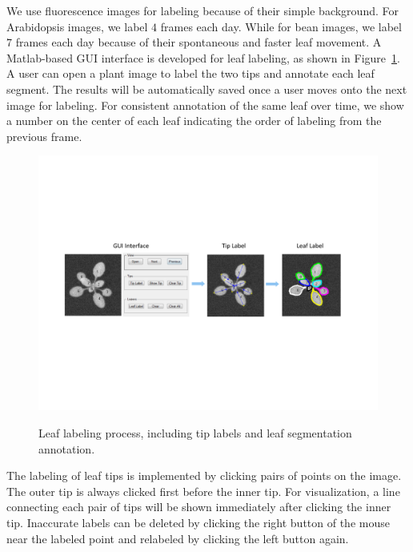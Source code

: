 We use fluorescence images for labeling because of their simple background.
For Arabidopsis images, we label $4$ frames each day.
While for bean images, we label $7$ frames each day because of their spontaneous and faster leaf movement.
A Matlab-based GUI interface is developed for leaf labeling, as shown in Figure~\ref{fig:label}.
A user can open a plant image to label the two tips and annotate each leaf segment.
The results will be automatically saved once a user moves onto the next image for labeling.
For consistent annotation of the same leaf over time, we show a number on the center of each leaf indicating the order of labeling from the previous frame.

\begin{figure}
\centering
\includegraphics[width=.98\textwidth]{Figures/labeling}\\
\caption{Leaf labeling process, including tip labels and leaf segmentation annotation.}
\label{fig:label}
\end{figure}

The labeling of leaf tips is implemented by clicking pairs of points on the image.
The outer tip is always clicked first before the inner tip.
For visualization, a line connecting each pair of tips will be shown immediately after clicking the inner tip. 
Inaccurate labels can be deleted by clicking the right button of the mouse near the labeled point and relabeled by clicking the left button again.

